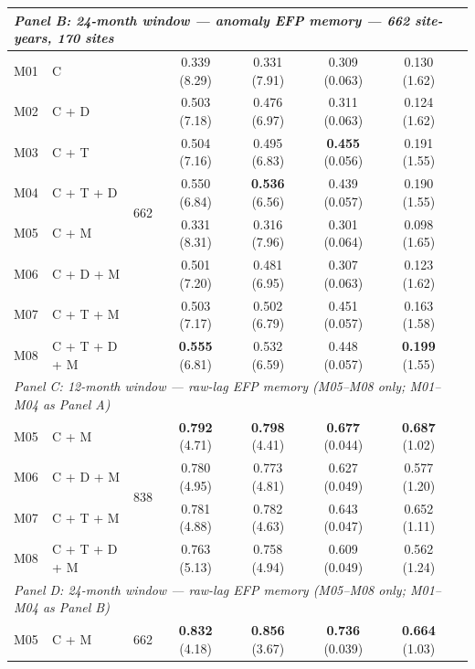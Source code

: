 \begin{table}[htbp]
\begin{tabular}{llcccccc}
\midrule
\multicolumn{7}{l}{\textit{Panel B: 24-month window --- anomaly EFP memory --- 662 site-years, 170 sites}} \\
\midrule
M01 & C                   & \multirow{8}{*}{662} & 0.339 (8.29) & 0.331 (7.91) & 0.309 (0.063) & 0.130 (1.62) \\
M02 & C + D               &                      & 0.503 (7.18) & 0.476 (6.97) & 0.311 (0.063) & 0.124 (1.62) \\
M03 & C + T               &                      & 0.504 (7.16) & 0.495 (6.83) & \textbf{0.455} (0.056) & 0.191 (1.55) \\
M04 & C + T + D           &                      & 0.550 (6.84) & \textbf{0.536} (6.56) & 0.439 (0.057) & 0.190 (1.55) \\
M05 & C + M               &                      & 0.331 (8.31) & 0.316 (7.96) & 0.301 (0.064) & 0.098 (1.65) \\
M06 & C + D + M           &                      & 0.501 (7.20) & 0.481 (6.95) & 0.307 (0.063) & 0.123 (1.62) \\
M07 & C + T + M           &                      & 0.503 (7.17) & 0.502 (6.79) & 0.451 (0.057) & 0.163 (1.58) \\
M08 & C + T + D + M       &                      & \textbf{0.555} (6.81) & 0.532 (6.59) & 0.448 (0.057) & \textbf{0.199} (1.55) \\
\midrule
\multicolumn{7}{l}{\textit{Panel C: 12-month window --- raw-lag EFP memory (M05--M08 only; M01--M04 as Panel A)}} \\
\midrule
M05 & C + M               & \multirow{4}{*}{838} & \textbf{0.792} (4.71) & \textbf{0.798} (4.41) & \textbf{0.677} (0.044) & \textbf{0.687} (1.02) \\
M06 & C + D + M           &                      & 0.780 (4.95) & 0.773 (4.81) & 0.627 (0.049) & 0.577 (1.20) \\
M07 & C + T + M           &                      & 0.781 (4.88) & 0.782 (4.63) & 0.643 (0.047) & 0.652 (1.11) \\
M08 & C + T + D + M       &                      & 0.763 (5.13) & 0.758 (4.94) & 0.609 (0.049) & 0.562 (1.24) \\
\midrule
\multicolumn{7}{l}{\textit{Panel D: 24-month window --- raw-lag EFP memory (M05--M08 only; M01--M04 as Panel B)}} \\
\midrule
M05 & C + M               & \multirow{4}{*}{662} & \textbf{0.832} (4.18) & \textbf{0.856} (3.67) & \textbf{0.736} (0.039) & \textbf{0.664} (1.03) \\

\end{tabular}
\end{table}

